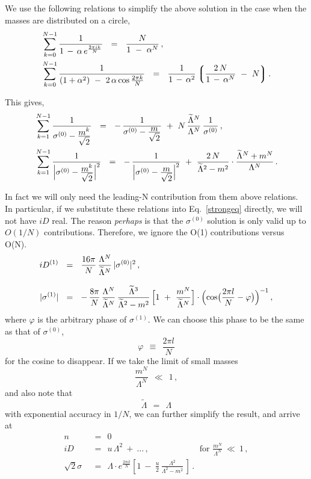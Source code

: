 \documentclass[epsfig,12pt]{article}
\newcommand{\wt}{\widetilde}
\newcommand{\lgr}{\left\lgroup}
\newcommand{\rgr}{\right\rgroup}
\newcommand{\Do}{{D^{(1)}}}
\newcommand{\sigz}{{\sigma^{(0)}}}
\newcommand{\sigo}{{\sigma^{(1)}}}
\begin{document}
{	We use the following relations to simplify the above solution in the case when the masses 
	are distributed on a circle,
\begin{align*}
%
	&
	\sum_{k=0}^{N-1} \frac{1} { 1 \,-\, \alpha\,e^{\frac{2\pi i k}{N}} } ~~=~~
		\frac{N}{1 ~-~ \alpha^N}\,,
	\\
%
	&
	\sum_{k=0}^{N-1} \frac{1} { (1 + \alpha^2) ~-~ 2\,\alpha \cos \frac{2 \pi k}{N} }
		~~=~~
	\frac{1} {1 \,-\, \alpha^2} 
	\lgr \frac{2\,N}{ 1 \,-\, \alpha^N } ~-~ N \rgr .
\end{align*}

	This gives,
\begin{align*}
%
	& 
	\sum_{k=1}^{N-1} \frac{ 1 }
		{ \sigz - \frac{\displaystyle m^k}{\displaystyle \sqrt{2}} } ~~=~~ 
		 - \, \frac{ 1 }
		{ \sigz - \frac{\displaystyle m}{\displaystyle \sqrt{2}} } ~+~
		N\, \frac{\wt{\Lambda}{}^N}{\Lambda^N}\, \frac{1}{\sigz} \,,
	\\
%
	&
	\sum_{k=1}^{N-1} \frac{ 1 }
                { \Bigl| \sigz - \frac{\displaystyle m^k}{\displaystyle \sqrt{2}} \Bigr|^2 } ~~=~~
	-\, \frac{1}
	{ \Bigl| \sigz - \frac{\displaystyle m}{\displaystyle \sqrt{2}} \Bigr|^2 } 
	~+~
	\frac{2\,N}{ \wt{\Lambda}{}^2 - m^2 } \cdot
	\frac{ \wt{\Lambda}{}^N + m^N } { \Lambda^N }\,.
\end{align*}

	In fact we will only need the leading-N contribution from them above relations.
	In particular, if we substitute these relations into Eq.~\eqref{strongeq} directly,
	we will not have $ iD $ real.
	The reason {\it perhaps} is that the $ \sigz $ solution is only valid up to $ O(1/N) $
	contributions.
	Therefore, we ignore the O(1) contributions versus O(N).
\begin{align*}
%
	i \Do & ~~=~~ \frac{16\pi}{N}\, \frac{\Lambda^N}{\wt{\Lambda}{}^N}\, |\sigz|^2\,,
	\\[3mm]
%
	| \sigo | & ~~=~~
	-\, \frac{8\pi}{N}\, \frac{\Lambda^N}{\wt{\Lambda}{}^N}\,
		\frac{ \wt{\Lambda}{}^3 } {\wt{\Lambda}{}^2 - m^2 }\,
		\Bigl[ 1 ~+~ \frac{m^N}{\wt{\Lambda}{}^N} \Bigr] \cdot
		\Bigl( \cos \bigl( \frac{2\pi l }{N} - \varphi \bigr) \Bigr)^{-1}\,,
\end{align*}
	where $ \varphi $ is the arbitrary phase of $ \sigo $.
	We can choose this phase to be the same as that of $ \sigz $, 
\[
	\varphi ~~\equiv~~ \frac{2\pi l}{N}
\]
	for the cosine to disappear.
	If we take the limit of small masses
\[
	\frac{m^N}{\Lambda^N} ~~\ll~~ 1\,,
\]
	and also note that
\[
	\wt{\Lambda} ~~=~~ \Lambda 
\]
	with exponential accuracy in $ 1/N $,
	we can further simplify the result, and arrive at
\begin{align*}
%
	n & ~~=~~ 0 
	\\[3mm]
%
	i D &  ~~=~~ u\, \Lambda^2 ~+~ \ldots \,, 
	\qquad\qquad\qquad \text{for }\frac{m^N}{\Lambda^N} ~\ll~ 1\,,
	\\[3mm]
%
	\sqrt{2}\sigma & ~~=~~ \Lambda \cdot e^{\frac{2\pi i l}{N}} \left[1
			~-~ \frac{u}{2}\, 
				\frac{\Lambda^2}{\Lambda^2 - m^2}\,\right]
	\,.
\end{align*}

}
\end{document}
